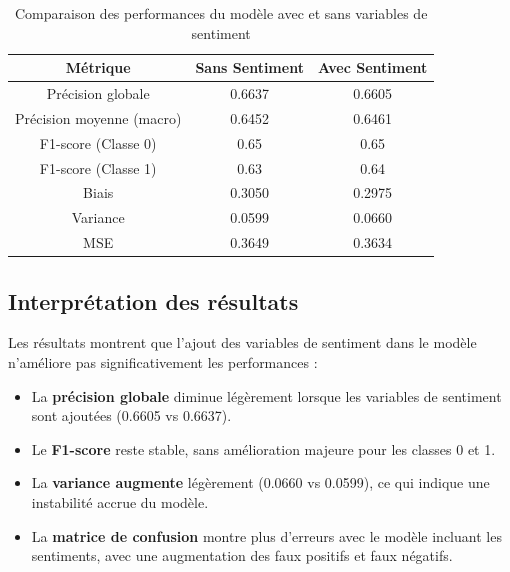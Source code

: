 \documentclass[a4paper,12pt]{article}
\begin{document}
\begin{table}[H]

\centering

\begin{tabular}{|c|c|c|}

\hline

\textbf{Métrique} & \textbf{Sans Sentiment} & \textbf{Avec Sentiment} \\ \hline

Précision globale & 0.6637 & 0.6605 \\ \hline

Précision moyenne (macro) & 0.6452 & 0.6461 \\ \hline

F1-score (Classe 0) & 0.65 & 0.65 \\ \hline

F1-score (Classe 1) & 0.63 & 0.64 \\ \hline

Biais & 0.3050 & 0.2975 \\ \hline

Variance & 0.0599 & 0.0660 \\ \hline

MSE & 0.3649 & 0.3634 \\ \hline

\end{tabular}

\caption{Comparaison des performances du modèle avec et sans variables de sentiment}

\end{table}
 
\bigskip
 
\subsection{Interprétation des résultats}
 
Les résultats montrent que l'ajout des variables de sentiment dans le modèle n'améliore pas significativement les performances :
 
\begin{itemize}

    \item La \textbf{précision globale} diminue légèrement lorsque les variables de sentiment sont ajoutées (0.6605 vs 0.6637).

    \item Le \textbf{F1-score} reste stable, sans amélioration majeure pour les classes 0 et 1.

    \item La \textbf{variance augmente} légèrement (0.0660 vs 0.0599), ce qui indique une instabilité accrue du modèle.

    \item La \textbf{matrice de confusion} montre plus d'erreurs avec le modèle incluant les sentiments, avec une augmentation des faux positifs et faux négatifs.

\end{itemize}
 
\end{document}
